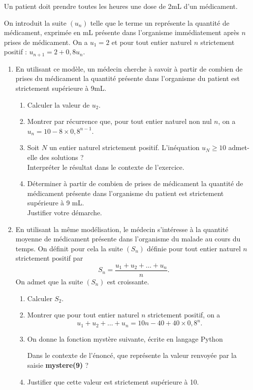 \documentclass[11pt,fleqn]{book} %
\begin{document}
\begin{exercise}[subtitle={(Asie 2025)}]
Un patient doit prendre toutes les heures une dose de 2mL d’un médicament.

On introduit la suite $(u_n)$ telle que le terme un représente la quantité de médicament, exprimée en mL présente dans l'organisme immédiatement après $n$ prises de médicament.
On a $u_1 = 2$ et pour tout entier naturel $n$ strictement positif : $u_{n+1} = 2+0,8u_n$.

\begin{enumerate}
\item En utilisant ce modèle, un médecin cherche à savoir à partir de combien de prises du
médicament la quantité présente dans l'organisme du patient est strictement supérieure
à 9mL.
\begin{enumerate}
\item Calculer la valeur de $u_2$.
\item Montrer par récurrence que, pour tout entier naturel non nul $n$, on a $u_n=10-8 \times 0,8^{n-1}$.
\item Soit $N$ un entier naturel strictement positif. L'inéquation $u_N\geqslant 10$ admet-elle des solutions ?\\
Interpréter le résultat dans le contexte de l'exercice.
\item Déterminer à partir de combien de prises de médicament la quantité de médicament présente dans l'organisme du patient est strictement supérieure à 9 mL.\\
Justifier votre démarche.
\end{enumerate}
\item En utilisant la même modélisation, le médecin s'intéresse à la quantité moyenne de médicament
présente dans l'organisme du malade au cours du temps. On définit pour cela la suite $(S_n)$ définie pour tout entier naturel $n$ strictement positif par
\[S_n=\dfrac{u_1+u_2+\ldots + u_n}{n}.\]
On admet que la suite $(S_n)$ est croissante.
\begin{enumerate}
\item Calculer $S_2$.
\item Montrer que pour tout entier naturel $n$ strictement positif, on a
\[u_1+u_2+\ldots +u_n = 10n-40+40 \times 0,8^n.\]
\newpage
\item On donne la fonction mystère suivante, écrite en langage Python

Dans le contexte de l'énoncé, que représente la valeur renvoyée par la saisie \textbf{mystere(9)} ?
\item Justifier que cette valeur est strictement supérieure à 10.
\end{enumerate}
\end{enumerate}
\end{exercise}
\end{document}
